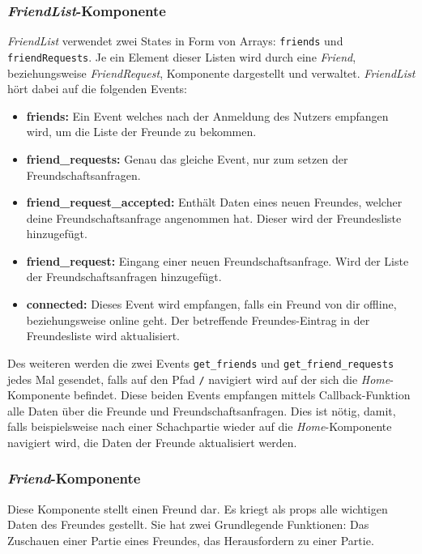 \subsubsection{\textit{FriendList}-Komponente}

\textit{FriendList} verwendet zwei States in Form von Arrays: \verb|friends| und \verb|friendRequests|. Je ein Element dieser Listen wird durch eine \textit{Friend}, beziehungsweise \textit{FriendRequest}, Komponente dargestellt und verwaltet. \textit{FriendList} hört dabei auf die folgenden Events: 
\begin{itemize}
\item \textbf{friends:} Ein Event welches nach der Anmeldung des Nutzers empfangen wird, um die Liste der Freunde zu bekommen.
\item \textbf{friend\_requests:} Genau das gleiche Event, nur zum setzen der Freundschaftsanfragen.
\item \textbf{friend\_request\_accepted:} Enthält Daten eines neuen Freundes, welcher deine Freundschaftsanfrage angenommen hat. Dieser wird der Freundesliste hinzugefügt.
\item \textbf{friend\_request:} Eingang einer neuen Freundschaftsanfrage. Wird der Liste der Freundschaftsanfragen hinzugefügt.
\item \textbf{connected:} Dieses Event wird empfangen, falls ein Freund von dir offline, beziehungsweise online geht. Der betreffende Freundes-Eintrag in der Freundesliste wird aktualisiert.
\end{itemize}

Des weiteren werden die zwei Events \verb|get_friends| und \verb|get_friend_requests| jedes Mal gesendet, falls auf den Pfad \verb|/| navigiert wird auf der sich die \textit{Home}-Komponente befindet. Diese beiden Events empfangen mittels Callback-Funktion alle Daten über die Freunde und Freundschaftsanfragen. Dies ist nötig, damit, falls beispielsweise nach einer Schachpartie wieder auf die \textit{Home}-Komponente navigiert wird, die Daten der Freunde aktualisiert werden.

\subsubsection{\textit{Friend}-Komponente}
Diese Komponente stellt einen Freund dar. Es kriegt als props alle wichtigen Daten des Freundes gestellt. Sie hat zwei Grundlegende Funktionen: Das Zuschauen einer Partie eines Freundes, das Herausfordern zu einer Partie. 

